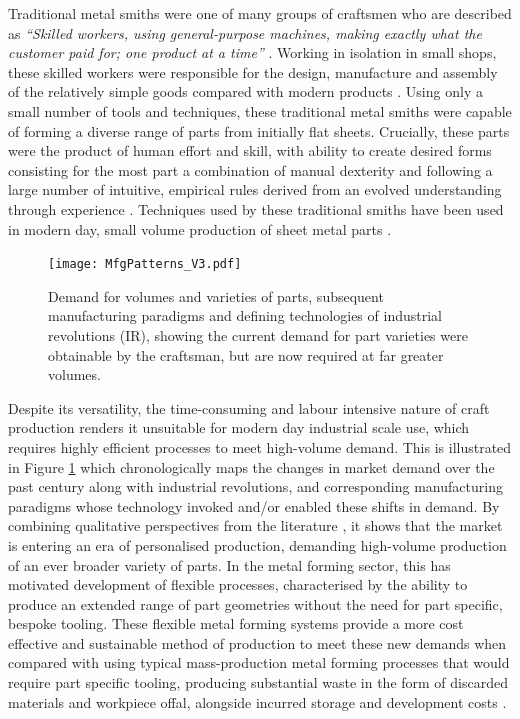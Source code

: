 Traditional metal smiths were one of many groups of craftsmen who are described as \textit{``Skilled workers, using general-purpose machines, making exactly what the customer paid for; one product at a time''} \citep{Koren2010TheRevolution}. Working in isolation in small shops, these skilled workers were responsible for the design, manufacture and assembly of the relatively simple goods compared with modern products \citep{Groover2015AutomationEdition}.  Using only a small number of tools and techniques, these traditional metal smiths were capable of forming a diverse range of parts from initially flat sheets. Crucially, these parts were the product of human effort and skill, with ability to create desired forms consisting for the most part a combination of manual dexterity and following a large number of intuitive, empirical rules derived from an evolved understanding through experience \citep{Hall1961EngineeringRevolution}. Techniques used by these traditional smiths have been used in modern day, small volume production of sheet metal parts \citep{Amos2015Bloodhoundfeathers}.

\begin{figure}[h]
	\centering
	\texttt{[image: MfgPatterns\_V3.pdf]}
	\caption{Demand for volumes and varieties of parts, subsequent manufacturing paradigms and defining technologies of industrial revolutions (IR), showing the current demand for part varieties were obtainable by the craftsman, but are now required at far greater volumes.}
	\label{fig:VarietyVolume}
\end{figure}

Despite its versatility, the time-consuming and labour intensive nature of craft production renders it unsuitable for modern day industrial scale use, which requires highly efficient processes to meet high-volume demand. This is illustrated in Figure \ref{fig:VarietyVolume} which chronologically maps the changes in market demand over the past century  along with industrial revolutions, and corresponding manufacturing paradigms whose technology invoked and/or enabled these shifts in demand. By combining qualitative perspectives from the literature \citep{Koren2010TheRevolution,Popkova2019FundamentalRevolutions,Mourtzis2012DecentralizedOutlook,Mourtzis2014TheCustomisation}, it shows that the market is entering an era of personalised production, demanding high-volume production of an ever broader variety of parts. In the metal forming sector, this has motivated development of flexible processes, characterised by the ability to produce an extended range of part geometries without the need for part specific, bespoke tooling. These flexible metal forming systems provide a more cost effective and sustainable method of production to meet these new demands when compared with using typical mass-production metal forming processes that would require part specific tooling, producing substantial waste in the form of discarded materials and workpiece offal, alongside incurred storage and development costs \citep{Cooper2017TheProcesses,Horton2019ImplementingComponents}. 


